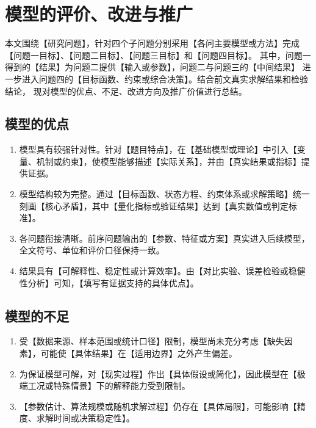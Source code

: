
\section{模型的评价、改进与推广}

本文围绕【研究问题】，针对四个子问题分别采用【各问主要模型或方法】完成
【问题一目标】、【问题二目标】、【问题三目标】和【问题四目标】。
其中，问题一得到的【结果】为问题二提供【输入或参数】，问题二与问题三的【中间结果】
进一步进入问题四的【目标函数、约束或综合决策】。结合前文真实求解结果和检验结论，
现对模型的优点、不足、改进方向及推广价值进行总结。

\subsection{模型的优点}

\begin{enumerate}
  \item 模型具有较强针对性。针对【题目特点】，在【基础模型或理论】中引入【变量、机制或约束】，使模型能够描述【实际关系】，并由【真实结果或指标】提供证据。
  \item 模型结构较为完整。通过【目标函数、状态方程、约束体系或求解策略】统一刻画【核心矛盾】，其中【量化指标或验证结果】达到【真实数值或判定标准】。
  \item 各问题衔接清晰。前序问题输出的【参数、特征或方案】真实进入后续模型，全文符号、单位和评价口径保持一致。
  \item 结果具有【可解释性、稳定性或计算效率】。由【对比实验、误差检验或稳健性分析】可知，【填写有证据支持的具体优点】。
\end{enumerate}

\subsection{模型的不足}

\begin{enumerate}
  \item 受【数据来源、样本范围或统计口径】限制，模型尚未充分考虑【缺失因素】，可能使【具体结果】在【适用边界】之外产生偏差。
  \item 为保证模型可解，对【现实过程】作出【具体假设或简化】，因此模型在【极端工况或特殊情景】下的解释能力受到限制。
  \item 【参数估计、算法规模或随机求解过程】仍存在【具体局限】，可能影响【精度、求解时间或决策稳定性】。
\end{enumerate}

